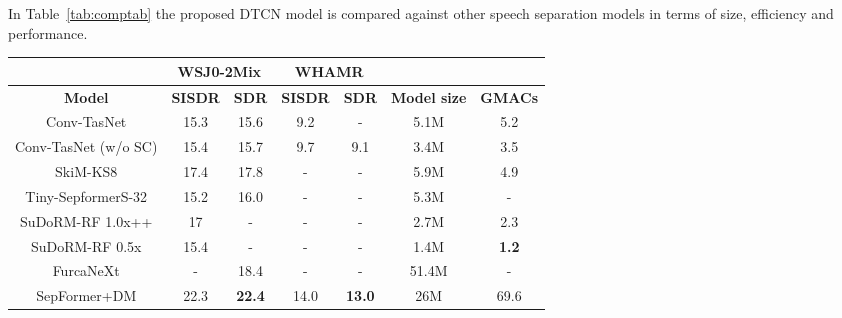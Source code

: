 \documentclass{article}
\begin{document}
In Table~\ref{tab:comptab} the proposed \ac{DTCN} model is compared against other speech separation models in terms of size, efficiency and performance.
\begin{table*}[!t]
\caption{Comparison of various \ac{DTCN} models against other speech separation models with varying size and complexity. Dynamic Mixing is abbreviated to DM. Shared weights are abbreviated to SW. Compuational efficiency is expressed in \ac{MACs}. Where possible, all MACs values have been estimated using \textit{thop}\cite{thop} unless a citation is provided.}
\label{tab:comptab}
\centering
\begin{tabular}{c|cc|cc|c|c}
\hline
\textbf{}                           & \multicolumn{2}{c|}{\textbf{WSJ0-2Mix}} & \multicolumn{2}{c|}{\textbf{WHAMR}} &                     &                     \\ \hline
\textbf{Model}                      & \textbf{SISDR}    & \textbf{SDR}    & \textbf{SISDR}  & \textbf{SDR}  & \textbf{Model size} & \textbf{GMACs} \\ \hline
Conv-TasNet \cite{convtasnet} & 15.3                & 15.6              &           9.2 \cite{WHAMR}       &        -        & 5.1M                & 5.2                 \\
Conv-TasNet (w/o SC) & 15.4                & 15.7              & 9.7               & 9.1             & 3.4M                &     3.5               \\
SkiM-KS8 \cite{skim}                & 17.4                & {17.8}              & -                 & -               & 5.9M                & 4.9  \cite{skim}               \\
Tiny-SepformerS-32 \cite{tinysep}   & 15.2               & 16.0             & -                 & -               & 5.3M                & -                   \\
SuDoRM-RF 1.0x++ \cite{sudormrf}    & 17                  & -                 & -                 & -               & 2.7M                &   2.3                 \\
SuDoRM-RF 0.5x \cite{sudormrf}    & 15.4                & -                 & -                 & -               & 1.4M                &        \textbf{1.2 }          \\
FurcaNeXt \cite{furcanext}          & -                   & {18.4}              & -                 & -               & 51.4M               & -                   \\
SepFormer+DM \cite{sepformer}       & {22.3}                &          \textbf{22.4}        & {14.0}                &    \textbf{13.0}             & 26M                 & 69.6 \cite{resepformer}             \\

\end{tabular}
\end{table*}
\end{document}

